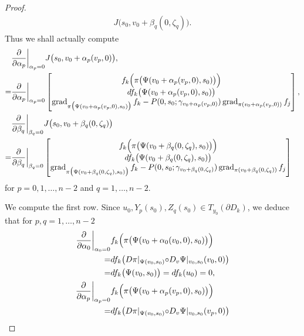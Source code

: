 \documentclass[a4paper,11pt,reqno]{amsart}
\numberwithin{equation}{section}
\theoremstyle{definition}
\theoremstyle{remark}
\begin{document}
\begin{proof}
\begin{align*}
  J\bigl(s_0,v_0+\beta_q(0,\zeta_q)\bigr). 
\end{align*}
%
%
Thus we shall actually compute
%
%
\begin{align*}
& \frac{\partial}{\partial \alpha_p}\bigg\vert_{\alpha_p=0}
  J\bigl(s_0,v_0+\alpha_p(v_p,0)\bigr),
\\
  =
& \frac{\partial}{\partial \alpha_p}\bigg\vert_{\alpha_p=0}
  \begin{bmatrix}
  f_k\Bigl(\pi\bigl(\Psi(v_0+\alpha_p(v_p,0),s_0)\bigr)\Bigr)
  \\
  df_k\bigl(\Psi(v_0+\alpha_p(v_p,0),s_0)\bigr)
  \\
  \operatorname{grad}_{\pi\bigl(\Psi(v_0+\alpha_p(v_p,0),s_0)\bigr)}f_k
  -
  P(0,s_0;\gamma_{v_0+\alpha_p(v_p,0)})
  \operatorname{grad}_{\pi(v_0+\alpha_p(v_p,0))}f_j
  \end{bmatrix},
\\
& \frac{\partial}{\partial \beta_q}\bigg\vert_{\beta_q=0}
  J\bigl(s_0,v_0+\beta_q(0,\zeta_q)\bigr)
\\
  =
& \frac{\partial}{\partial \beta_q}\bigg\vert_{\beta_q=0}
  \begin{bmatrix}
  f_k\Bigl(\pi\bigl(\Psi(v_0+\beta_q(0,\zeta_q),s_0)\bigr)\Bigr)
  \\
  df_k\bigl(\Psi(v_0+\beta_q(0,\zeta_q),s_0)\bigr)
  \\
  \operatorname{grad}_{\pi\bigl(\Psi(v_0+\beta_q(0,\zeta_q),s_0)\bigr)}f_k
  -
  P(0,s_0;\gamma_{v_0+\beta_q(0,\zeta_q)})
  \operatorname{grad}_{\pi(v_0+\beta_q(0,\zeta_q))}f_j
  \end{bmatrix}
\end{align*} 
%
%
for $p=0,1,\dotsc,n-2$ and $q=1,\dotsc,n-2$. 
%
%
\par
%
%
We compute the first row. 
Since $u_0, Y_p(s_0), Z_q(s_0) \in T_{y_0}(\partial{D_k})$, 
we deduce that for $p,q=1,\dotsc,n-2$  
%
%
\begin{align}
  \frac{\partial}{\partial \alpha_0}\bigg\vert_{\alpha_0=0}
&  f_k\Bigl(\pi\bigl(\Psi(v_0+\alpha_0(v_0,0),s_0)\bigr)\Bigr)
\nonumber
\\
  =
& df_k\bigl(D\pi\vert_{\Psi(v_0,s_0)}{\circ}D_v\Psi\vert_{v_0,s_0}(v_0,0)\bigr)
\nonumber
\\
  =
& df_k\bigl(\Psi(v_0,s_0)\bigr)
  =
  df_k(u_0)
  =0,
\label{equation:011}
\\
  \frac{\partial}{\partial \alpha_p}\bigg\vert_{\alpha_p=0}
& f_k\Bigl(\pi\bigl(\Psi(v_0+\alpha_p(v_p,0),s_0)\bigr)\Bigr)
\nonumber
\\
  =
& df_k\bigl(D\pi\vert_{\Psi(v_0,s_0)}{\circ}D_v\Psi\vert_{v_0,s_0}(v_p,0)\bigr)

\end{align}
\end{proof}
\end{document}
